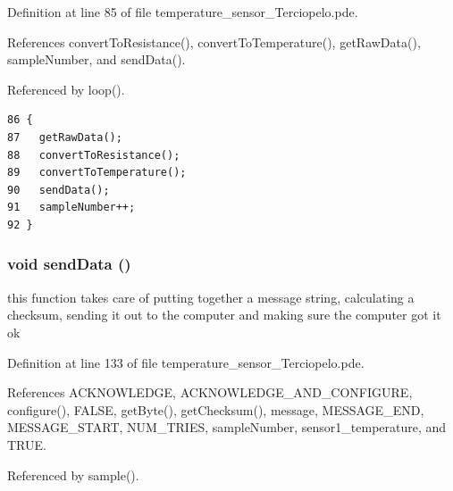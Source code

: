 Definition at line 85 of file temperature\_\-sensor\_\-Terciopelo.pde.

References convertToResistance(), convertToTemperature(), getRawData(), sampleNumber, and sendData().

Referenced by loop().

\begin{Code}\begin{verbatim}86 {
87   getRawData();
88   convertToResistance();
89   convertToTemperature();
90   sendData();
91   sampleNumber++;
92 }
\end{verbatim}
\end{Code}


\hypertarget{temperature__sensor___terciopelo_8pde_95b1b253ee46df6a93285803cf1f3370}{
\subsubsection[{sendData}]{\setlength{\rightskip}{0pt plus 5cm}void sendData ()}}
\label{temperature__sensor___terciopelo_8pde_95b1b253ee46df6a93285803cf1f3370}


this function takes care of putting together a message string, calculating a checksum, sending it out to the computer and making sure the computer got it ok 



Definition at line 133 of file temperature\_\-sensor\_\-Terciopelo.pde.

References ACKNOWLEDGE, ACKNOWLEDGE\_\-AND\_\-CONFIGURE, configure(), FALSE, getByte(), getChecksum(), message, MESSAGE\_\-END, MESSAGE\_\-START, NUM\_\-TRIES, sampleNumber, sensor1\_\-temperature, and TRUE.

Referenced by sample().

